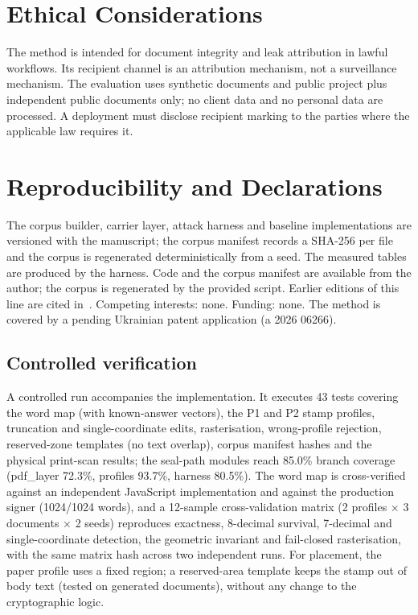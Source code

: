 \documentclass[journal]{IEEEtran}
\begin{document}
\section{Ethical Considerations}
The method is intended for document integrity and leak attribution in lawful workflows. Its recipient channel is an attribution mechanism, not a surveillance mechanism. The evaluation uses synthetic documents and public project plus independent public documents only; no client data and no personal data are processed. A deployment must disclose recipient marking to the parties where the applicable law requires it.

\section{Reproducibility and Declarations}
The corpus builder, carrier layer, attack harness and baseline implementations are versioned with the manuscript; the corpus manifest records a SHA-256 per file and the corpus is regenerated deterministically from a seed. The measured tables are produced by the harness. Code and the corpus manifest are available from the author; the corpus is regenerated by the provided script. Earlier editions of this line are cited in~\cite{baienko2026preprint}. Competing interests: none. Funding: none. The method is covered by a pending Ukrainian patent application (a 2026 06266).

\subsection{Controlled verification}
A controlled run accompanies the implementation. It executes 43 tests covering the word map (with
known-answer vectors), the P1 and P2 stamp profiles, truncation and single-coordinate edits,
rasterisation, wrong-profile rejection, reserved-zone templates (no text overlap), corpus manifest
hashes and the physical print-scan results; the seal-path modules reach 85.0\% branch coverage
(pdf\_layer 72.3\%, profiles 93.7\%, harness 80.5\%). The word map is cross-verified against an
independent JavaScript implementation and against the production signer (1024/1024 words), and a
12-sample cross-validation matrix (2 profiles $\times$ 3 documents $\times$ 2 seeds) reproduces
exactness, 8-decimal survival, 7-decimal and single-coordinate detection, the geometric invariant
and fail-closed rasterisation, with the same matrix hash across two independent runs. For placement,
the paper profile uses a fixed region; a reserved-area template keeps the stamp out of body text
(tested on generated documents), without any change to the cryptographic logic.
\end{document}
